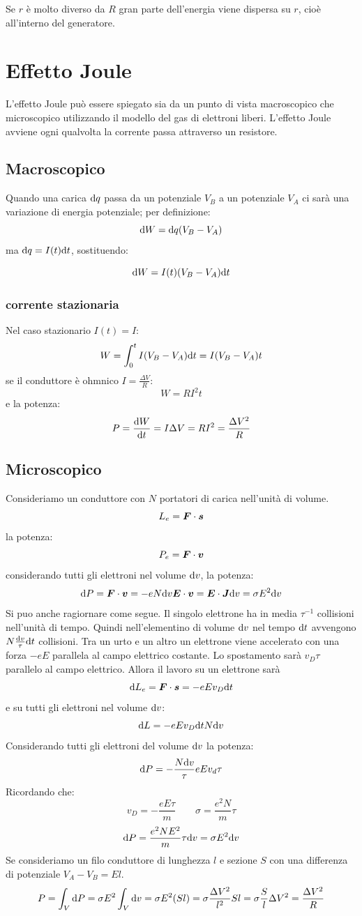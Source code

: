 Se $r$ è molto diverso da $R$ gran parte dell'energia viene dispersa su $r$, cioè all'interno del generatore.

\section{Effetto Joule}
L'effetto Joule può essere spiegato sia da un punto di vista macroscopico che microscopico utilizzando il modello del gas di elettroni liberi. L'effetto Joule avviene ogni qualvolta la corrente passa attraverso un resistore.
\subsection{Macroscopico}
Quando una carica $\mathrm{d} q$ passa da un potenziale $V_B$ a un potenziale $V_A$ ci sarà una variazione di energia potenziale; per definizione:
\[\mathrm{d} W=\mathrm{d} q(V_B-V_A)\]
ma $\mathrm{d} q=I(t)\mathrm{d} t$, sostituendo:
\begin{legge}
  \begin{equation}
    \mathrm{d} W=I(t)(V_B-V_A)\mathrm{d} t
  \end{equation}
\end{legge}
\subsubsection{corrente stazionaria}
Nel caso stazionario $I(t)=I$:
\[W=\int_0^t I(V_B-V_A)\mathrm{d} t=I(V_B-V_A)t\]
se il conduttore è ohmnico $I=\frac{\Delta V}{R}$:
\[W=RI^2t\]
e la potenza:
\[P=\frac{\mathrm{d} W}{\mathrm{d} t}=I\Delta V=RI^2=\frac{\Delta V^2}{R}\]

\subsection{Microscopico}
Consideriamo un conduttore con $N$ portatori di carica nell'unità di volume.
\[
  L_e=\boldsymbol{F}\cdot\boldsymbol{s}
\]
la potenza:
\[
  P_e =\boldsymbol{F}\cdot\boldsymbol{v}
\]
considerando tutti gli elettroni nel volume $\mathrm{d} v$, la potenza:
\[
  \mathrm{d} P=\boldsymbol{F}\cdot\boldsymbol{v}=-eN\mathrm{d} v\boldsymbol{E}\cdot \boldsymbol{v} = \boldsymbol{E}\cdot\boldsymbol{J}\mathrm{d} v =\sigma E^2\mathrm{d} v
\]
Si puo anche ragiornare come segue.  Il singolo elettrone ha in media $\tau^{-1}$ collisioni nell'unità di tempo. Quindi nell'elementino di volume $\mathrm{d} v$ nel tempo $\mathrm{d} t$ avvengono $N\frac{\mathrm{d} v}{\tau}\mathrm{d} t$ collisioni. Tra un urto e un altro un elettrone viene accelerato con una forza $-eE$ parallela al campo elettrico costante. Lo spostamento sarà $v_D\tau$ parallelo al campo elettrico. Allora il lavoro su un elettrone sarà
\[
  \mathrm{d} L_e =\boldsymbol{F}\cdot\boldsymbol{s}=-e Ev_D\mathrm{d} t
\]
e su tutti gli elettroni nel volume $\mathrm{d} v$:
\[
  \mathrm{d} L = -e Ev_D\mathrm{d} t N\mathrm{d} v
\]
Considerando tutti gli elettroni del volume $\mathrm{d} v$ la potenza:
\[
  \mathrm{d} P=-\frac{N\mathrm{d} v}{\tau}eEv_d\tau
\]
Ricordando che:
\[v_D=-\frac{eE\tau}{m}\qquad\sigma=\frac{e^2N}{m}\tau\]
\[\mathrm{d} P=\frac{e^2NE^2}{m}\tau\mathrm{d} v=\sigma E^2\mathrm{d} v\]
Se consideriamo un filo conduttore di lunghezza $l$ e sezione $S$ con una differenza di potenziale $V_A-V_B=El$.
\[P=\int_V\mathrm{d} P=\sigma E^2\int_V\mathrm{d} v=\sigma E^2(Sl)=\sigma\frac{\Delta V^2}{l^2}Sl=\sigma\frac{S}{l}\Delta V^2=\frac{\Delta V^2}{R}\]

